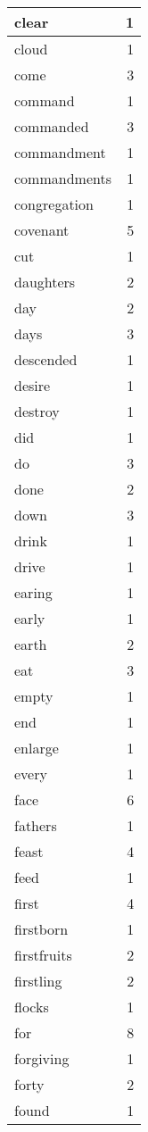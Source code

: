 \begin{center}
\begin{longtable}{l|r}
clear & 1 \\ \hline
cloud & 1 \\ \hline
come & 3 \\ \hline
command & 1 \\ \hline
commanded & 3 \\ \hline
commandment & 1 \\ \hline
commandments & 1 \\ \hline
congregation & 1 \\ \hline
covenant & 5 \\ \hline
cut & 1 \\ \hline
daughters & 2 \\ \hline
day & 2 \\ \hline
days & 3 \\ \hline
descended & 1 \\ \hline
desire & 1 \\ \hline
destroy & 1 \\ \hline
did & 1 \\ \hline
do & 3 \\ \hline
done & 2 \\ \hline
down & 3 \\ \hline
drink & 1 \\ \hline
drive & 1 \\ \hline
earing & 1 \\ \hline
early & 1 \\ \hline
earth & 2 \\ \hline
eat & 3 \\ \hline
empty & 1 \\ \hline
end & 1 \\ \hline
enlarge & 1 \\ \hline
every & 1 \\ \hline
face & 6 \\ \hline
fathers & 1 \\ \hline
feast & 4 \\ \hline
feed & 1 \\ \hline
first & 4 \\ \hline
firstborn & 1 \\ \hline
firstfruits & 2 \\ \hline
firstling & 2 \\ \hline
flocks & 1 \\ \hline
for & 8 \\ \hline
forgiving & 1 \\ \hline
forty & 2 \\ \hline
found & 1 \\ \hline

\end{longtable}
\end{center}
